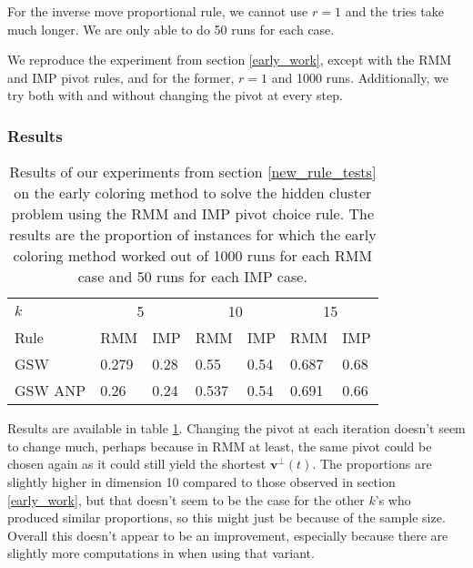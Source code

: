 \documentclass[12pt]{article}
\begin{document}
For the inverse move proportional rule, we cannot use $r=1$ and the tries take much longer. We are only able to do 50 runs for each case.

We reproduce the experiment from section \ref{early_work}, except with the RMM and IMP pivot rules, and for the former, $r=1$ and 1000 runs. Additionally, we try both with and without changing the pivot at every step.

\subsubsection{Results}
\begin{table}[h!]
\centering
\caption{Results of our experiments from section \ref{new_rule_tests} on the early coloring method to solve the hidden cluster problem using the RMM and IMP pivot choice rule. The results are the proportion of instances for which the early coloring method worked out of 1000 runs for each RMM case and 50 runs for each IMP case.}
\begin{tabular}{l|ll|ll|ll}
$k$  & \multicolumn{2}{c}{5} & \multicolumn{2}{c}{10} & \multicolumn{2}{c}{15}\\
Rule &RMM&IMP&RMM&IMP&RMM&IMP\\ \hline
GSW  &0.279&0.28&0.55&0.54&0.687&0.68\\
GSW ANP&0.26&0.24&0.537&0.54&0.691&0.66
\end{tabular}
\label{early_coloring_method_exp2}
\end{table}
Results are available in table \ref{early_coloring_method_exp2}. Changing the pivot at each iteration doesn't seem to change much, perhaps because in RMM at least, the same pivot could be chosen again as it could still yield the shortest $\textbf{v}^\perp(t)$. The proportions are slightly higher in dimension 10 compared to those observed in section \ref{early_work}, but that doesn't seem to be the case for the other $k$'s who produced similar proportions, so this might just be because of the sample size. Overall this doesn't appear to be an improvement, especially because there are slightly more computations in when using that variant.

 
\end{document}
